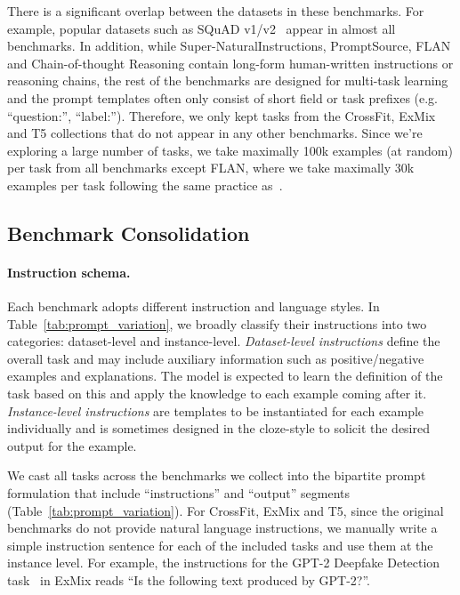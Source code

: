 There is a significant overlap between the datasets in these benchmarks. For example, popular datasets such as SQuAD v1/v2~\citep{rajpurkar2016squad,rajpurkar2018squadv2} appear in almost all benchmarks. In addition, while Super-NaturalInstructions, PromptSource, FLAN and Chain-of-thought Reasoning contain long-form human-written instructions or reasoning chains, the rest of the benchmarks are designed for multi-task learning and the prompt templates often only consist of short field or task prefixes (e.g. ``question:'', ``label:''). Therefore, we only kept tasks from the CrossFit, ExMix and \textsc{T5} collections that do not appear in any other benchmarks. Since we're exploring a large number of tasks, we take maximally 100k examples (at random) per task from all benchmarks except FLAN, where we take maximally 30k examples per task following the same practice as~\cite{wei2021flan}.

\subsection{Benchmark Consolidation}

\paragraph{Instruction schema.} Each benchmark adopts different instruction and language styles. In Table~\ref{tab:prompt_variation}, we broadly classify their instructions into two categories: dataset-level and instance-level. \emph{Dataset-level instructions} define the overall task and may include auxiliary information such as positive/negative examples and explanations. The model is expected to learn the definition of the task based on this and apply the knowledge to each example coming after it. \emph{Instance-level instructions} are templates to be instantiated for each example individually and is sometimes designed in the cloze-style to solicit the desired output for the example.

We cast all tasks across the benchmarks we collect into the bipartite prompt formulation that include ``instructions'' and ``output'' segments (Table~\ref{tab:prompt_variation}). 
For CrossFit, ExMix and \textsc{T5}, since the original benchmarks do not provide natural language instructions, we manually write a simple instruction sentence for each of the included tasks and use them at the instance level. For example, the instructions for the GPT-2 Deepfake Detection task~\citep{radfordgpt2output} in ExMix reads ``Is the following text produced by GPT-2?''.

